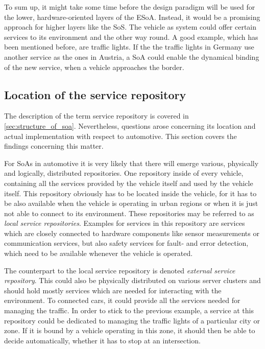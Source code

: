 To sum up, it might take some time before the design paradigm will be used for the lower, hardware-oriented layers of the ESoA. Instead, it would be a promising approach for higher layers like the SoS. The vehicle as system could offer certain services to its environment and the other way round. A good example, which has been mentioned before, are traffic lights. If the the traffic lights in Germany use another service as the ones in Austria, a SoA could enable the dynamical binding of the new service, when a vehicle approaches the border.


\subsection{Location of the service repository}
The description of the term service repository is covered in \ref{sec:structure_of_soa}. Nevertheless, questions arose concerning its location and actual implementation with respect to automotive. This section covers the findings concerning this matter.

For SoAs in automotive it is very likely that there will emerge various, physically and logically, distributed repositories. One repository inside of every vehicle, containing all the services provided by the vehicle itself and used by the vehicle itself. This repository obviously has to be located inside the vehicle, for it has to be also available when the vehicle is operating in urban regions or when it is just not able to connect to its environment. These repositories may be referred to as \emph{local service repositories}. Examples for services in this repository are services which are closely connected to hardware components like sensor measurements or communication services, but also safety services for fault- and error detection, which need to be available whenever the vehicle is operated.

The counterpart to the local service repository is denoted \emph{external service repository}. This could also be physically distributed on various server clusters and should hold mostly services which are needed for interacting with the environment. To connected cars, it could provide all the services needed for managing the traffic. In order to stick to the previous example, a service at this repository could be dedicated to managing the traffic lights of a particular city or zone. If it is bound by a vehicle operating in this zone, it should then be able to decide automatically, whether it has to stop at an intersection.

